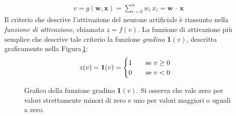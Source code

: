 % 
\begin{gather*}
    v = g\left(\mathbf{w}, \mathbf{x}\right) = \sum_{i = 0}^n w_i\,x_i = \mathbf{w}\,\cdot\,\mathbf{x}
\end{gather*}
% 
Il criterio che descrive l'attivazione del neurone artificiale è riassunto nella \textsl{funzione di attivazione}, chiamata $z = f(v)$. La funzione di attivazione più semplice che descrive tale criterio la funzione \textsl{gradino} \textbf{1}$(v)$, descritta graficamente nella Figura\,\ref{fig:step-function}:
% 
\begin{gather*}
    z(v) = \text{\textbf{1}}(v) =
    \begin{cases}
        1 \hspace{20px} \text{se } v\geq0\\
        0 \hspace{20px} \text{se } v<0
    \end{cases}
\end{gather*}
% 
\begin{figure}[!b]
    \centering
    
    \caption[Grafico della funzione gradino \textsl{1}$(v)$.]{Grafico della funzione gradino \textbf{1}$(v)$. Si osserva che vale zero per valori strettamente minori di zero e uno per valori maggiori o uguali a zero.}\label{fig:step-function}
\end{figure}

